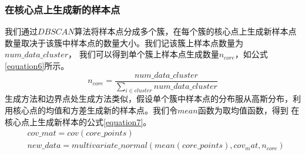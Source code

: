 \documentclass{article}
\begin{document}
\subsubsection{在核心点上生成新的样本点}
我们通过$DBSCAN$算法将样本点分成多个簇，在每个簇的核心点上生成新样本点数量取决于该簇中样本点的数量大小。我们记该簇上样本点数量为$num\_data\_cluster$，
我们可以得到单个簇上样本点生成数量$n_{core}$，如公式\ref{equation6}所示。
\begin{equation}
  \label{equation6}
  n_{core}=\frac{num\_data\_cluster}{\sum_{i \in cluster} num\_data\_cluster}
\end{equation}
生成方法和边界点处生成方法类似，假设单个簇中样本点的分布服从高斯分布，利用核心点的均值和方差生成新的样本点。我们令$mean$函数为取均值函数，得到
在核心点上生成新样本的公式\ref{equation7}。
\begin{equation}
  \label{equation7}
  \begin{aligned}
    & cov\_mat=cov(core\_points) \\
    & new\_data=multivariate\_normal(mean(core\_points),cov_mat,n_{core})
  \end{aligned}
\end{equation}
\end{document}
